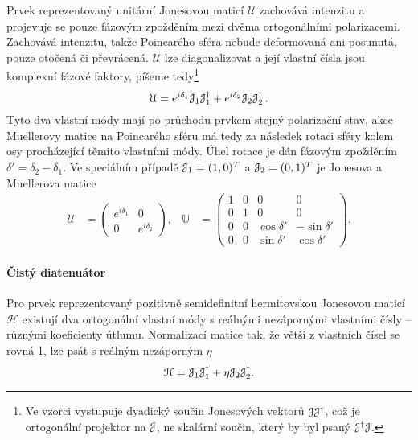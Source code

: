 Prvek reprezentovaný unitární Jonesovou maticí $\mathcal{U}$ zachovává intenzitu a projevuje se pouze fázovým zpožděním mezi dvěma ortogonálními polarizacemi.
Zachovává intenzitu, takže Poincarého sféra nebude deformovaná ani posunutá, pouze otočená či převrácená.
$\mathcal{U}$ lze diagonalizovat a její vlastní čísla jsou komplexní fázové faktory, píšeme tedy\footnote{Ve vzorci vystupuje dyadický součin Jonesových vektorů $\mathcal{J}\mathcal{J}^\dagger$, což je ortogonální projektor na $\mathcal{J}$, ne skalární součin, který by byl psaný $\mathcal{J}^\dagger \mathcal{J}$.}
\begin{equation}
    \mathcal{U}=e^{i\delta_1} \mathcal{J}_1 \mathcal{J}_1^\dagger + e^{i\delta_2} \mathcal{J}_2 \mathcal{J}_2^\dagger\,.
\end{equation}
Tyto dva vlastní módy mají po průchodu prvkem stejný polarizační stav, akce Muellerovy matice na Poincarého sféru má tedy za následek rotaci sféry kolem osy procházející těmito vlastními módy.
Úhel rotace je dán fázovým zpožděním $\delta'=\delta_2-\delta_1$.
Ve speciálním případě $\mathcal{J}_1=(1,0)^T$ a $\mathcal{J}_2=(0,1)^T$ je Jonesova a Muellerova matice
\begin{align}
\label{eqn:cisty-retarder}
\mathcal{U}
& =\begin{pmatrix}
        e^{i\delta_1} & 0 \\ 0 & e^{i\delta_2}
        \end{pmatrix} ,
& \mathbb{U}
& =\begin{pmatrix}
        1 & 0 & 0 & 0 \\ 0 & 1 & 0 & 0 \\
        0 & 0 & \cos\delta' & -\sin\delta' \\ 0 & 0 & \sin\delta' & \cos\delta'
        \end{pmatrix} .
\end{align}

\paragraph{Čistý diatenuátor}

Pro prvek reprezentovaný pozitivně semidefinitní hermitovskou Jonesovou maticí $\mathcal{H}$ existují dva ortogonální vlastní módy s reálnými nezápornými vlastními čísly -- různými koeficienty útlumu.
Normalizací matice tak, že větší z vlastních čísel se rovná 1, lze psát s reálným nezáporným $\eta$
\begin{equation}
    \mathcal{H}=\mathcal{J}_1 \mathcal{J}_1^\dagger + \eta \mathcal{J}_2 \mathcal{J}_2^\dagger .
\end{equation}

